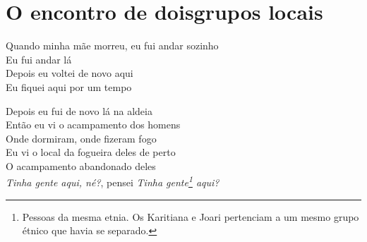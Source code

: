\vspace*{\fill}

 \chapter[O encontro de dois grupos locais]{O encontro de dois\break grupos locais}

\begin{linenumbers}
  \noindent Quando minha mãe morreu, eu fui andar sozinho\\
  Eu fui andar lá\\
  Depois eu voltei de novo aqui\\
  Eu fiquei aqui por um tempo
 
\end{linenumbers}

\bigskip

\begin{linenumbers}
 
\noindent   Depois eu fui de novo lá na aldeia\\
  Então eu vi o acampamento dos homens\\
  Onde dormiram, onde fizeram fogo\\
  Eu vi o local da fogueira deles de perto\\
  O acampamento abandonado deles\\
  \textit{Tinha gente aqui, né?}, pensei \textit{Tinha gente\footnote{Pessoas da
   mesma etnia. Os Karitiana e Joari pertenciam a um mesmo grupo étnico
   que havia se separado.} aqui?}

\end{linenumbers}

\bigskip

